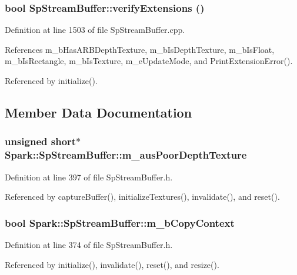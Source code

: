 \subsubsection{\setlength{\rightskip}{0pt plus 5cm}bool Sp\-Stream\-Buffer::verify\-Extensions ()\hspace{0.3cm}{\tt  [protected]}}\label{classSpark_1_1SpStreamBuffer_b4}


Definition at line 1503 of file Sp\-Stream\-Buffer.cpp.

References m\_\-b\-Has\-ARBDepth\-Texture, m\_\-b\-Is\-Depth\-Texture, m\_\-b\-Is\-Float, m\_\-b\-Is\-Rectangle, m\_\-b\-Is\-Texture, m\_\-e\-Update\-Mode, and Print\-Extension\-Error().

Referenced by initialize().

\subsection{Member Data Documentation}
\subsubsection{\setlength{\rightskip}{0pt plus 5cm}unsigned short$\ast$ {\bf Spark::Sp\-Stream\-Buffer::m\_\-aus\-Poor\-Depth\-Texture}\hspace{0.3cm}{\tt  [protected]}}\label{classSpark_1_1SpStreamBuffer_p29}


Definition at line 397 of file Sp\-Stream\-Buffer.h.

Referenced by capture\-Buffer(), initialize\-Textures(), invalidate(), and reset().
\subsubsection{\setlength{\rightskip}{0pt plus 5cm}bool {\bf Spark::Sp\-Stream\-Buffer::m\_\-b\-Copy\-Context}\hspace{0.3cm}{\tt  [protected]}}\label{classSpark_1_1SpStreamBuffer_p20}


Definition at line 374 of file Sp\-Stream\-Buffer.h.

Referenced by initialize(), invalidate(), reset(), and resize().
